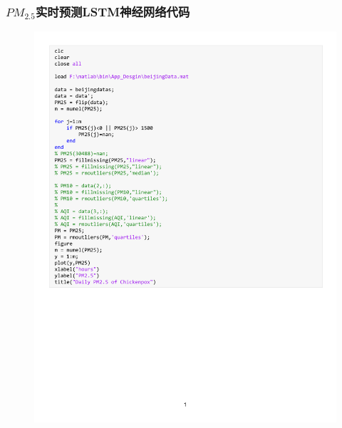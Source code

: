 \documentclass[UTF8]{ctexart}
\begin{document}
\subsubsection{$PM_{2.5}$实时预测LSTM神经网络代码}
\begin{figure}[H] %
    \centering %
    \includegraphics[width=1.2\textwidth,page=1]{./code/BeijingNet1.pdf} %
\end{figure}
\end{document}
